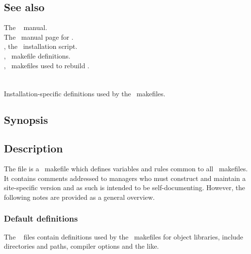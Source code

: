 \subsection*{See also}

The \gnu\  manual.\\
The \gnu\ manual page for .\\
, the \aipspp\ installation script.\\
, \aipspp\ makefile definitions.\\
, \gnu\ makefiles used to rebuild \aipspp.
 

\newpage
\section{}
\label{makedefs}

Installation-specific definitions used by the \aipspp\ makefiles.

\subsection*{Synopsis}

\begin{synopsis}
\end{synopsis}

\subsection*{Description}

The  file is a \gnu\ makefile which defines variables and rules
common to all \aipspp\ makefiles.  It contains comments addressed to \aipspp
managers who must construct and maintain a site-specific version and as such
is intended to be self-documenting.  However, the following notes are provided
as a general overview.

\subsubsection*{Default definitions}

The \aipspp\  files contain definitions used by the \aipspp\ 
makefiles for object libraries, include directories and paths, compiler
options and the like.

